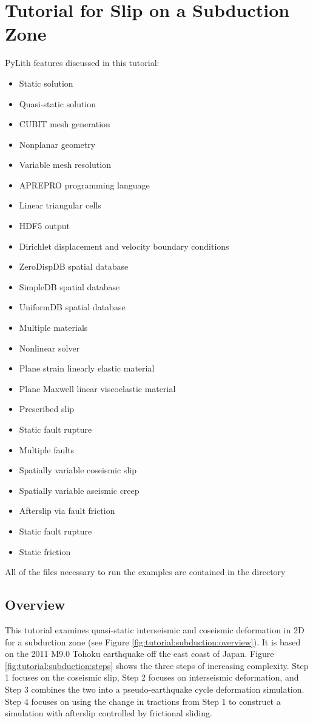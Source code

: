 \section{Tutorial for Slip on a Subduction Zone}
\label{sec:example:subduction}

PyLith features discussed in this tutorial:
\begin{itemize}
\item Static solution
\item Quasi-static solution
\item CUBIT mesh generation
\item Nonplanar geometry
\item Variable mesh resolution
\item APREPRO programming language
\item Linear triangular cells
\item HDF5 output
\item Dirichlet displacement and velocity boundary conditions
\item ZeroDispDB spatial database
\item SimpleDB spatial database
\item UniformDB spatial database
\item Multiple materials
\item Nonlinear solver
\item Plane strain linearly elastic material
\item Plane Maxwell linear viscoelastic material
\item Prescribed slip
\item Static fault rupture
\item Multiple faults
\item Spatially variable coseismic slip
\item Spatially variable aseismic creep
\item Afterslip via fault friction
\item Static fault rupture
\item Static friction
\end{itemize}
All of the files necessary to run the examples are contained in the
directory 


\subsection{Overview}

This tutorial examines quasi-static interseismic and coseismic
deformation in 2D for a subduction zone (see Figure
\vref{fig:tutorial:subduction:overview}).  It is based on the 2011
M9.0 Tohoku earthquake off the east coast of Japan. Figure
\vref{fig:tutorial:subduction:steps} shows the three steps of
increasing complexity. Step 1 focuses on the coseismic slip, Step 2
focuses on interseismic deformation, and Step 3 combines the two into
a pseudo-earthquake cycle deformation simulation. Step 4 focuses on
using the change in tractions from Step 1 to construct a simulation
with afterslip controlled by frictional sliding.

